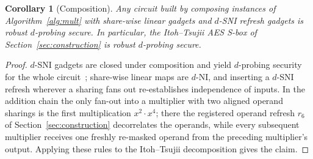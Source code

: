 \documentclass[lettersize,journal]{IEEEtran}
\newtheorem{corollary}{Corollary}
\begin{document}
\begin{corollary}[Composition]
\label{cor:comp}
Any circuit built by composing instances of Algorithm~\ref{alg:mult} with
share-wise linear gadgets and $d$-SNI refresh gadgets is robust $d$-probing
secure. In particular, the Itoh--Tsujii AES S-box of
Section~\ref{sec:construction} is robust $d$-probing secure.
\end{corollary}
\begin{proof}
$d$-SNI gadgets are closed under composition and yield $d$-probing security for
the whole circuit~\cite{barthe2016strong,faust2018composable}; share-wise
linear maps are $d$-NI, and inserting a $d$-SNI refresh wherever a sharing fans
out re-establishes independence of inputs.  In the addition chain the only
fan-out into a multiplier with two aligned operand sharings is the first
multiplication $x^{2}{\cdot}x^{4}$; there the registered operand refresh
$r_6$ of Section~\ref{sec:construction} decorrelates the operands, while
every subsequent multiplier receives one freshly re-masked operand from the
preceding multiplier's output.  Applying these rules to the Itoh--Tsujii
decomposition gives the claim.
\end{proof}
\end{document}
